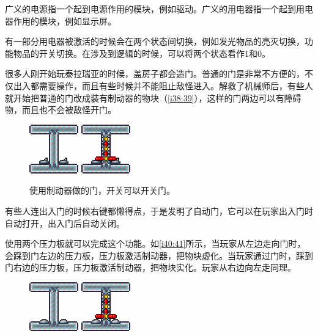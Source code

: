 广义的电源指一个起到电源作用的模块，例如驱动。广义的用电器指一个起到用电器作用的模块，例如显示屏。

有一部分用电器被激活的时候会在两个状态间切换，例如发光物品的亮灭切换，功能物品的开关切换。在涉及到逻辑的时候，可以将两个状态看作1和0。

\begin{example}[自动门]\label{exa5}

很多人刚开始玩泰拉瑞亚的时候，盖房子都会造门。普通的门是非常不方便的，不仅出入都需要操作，而且有些时候并不能阻止敌怪进入。解救了机械师后，有些人就开始把普通的门改成装有制动器的物块（\autoref{i38:39}），这样的门两边可以有障碍物，而且也不会被敌怪开门。

\begin{figure}[!ht]
\begin{center}
\includegraphics{images/38.png}
\qquad
\includegraphics{images/39.png}
\end{center}
\caption{使用制动器做的门，开关可以开关门。}
\label{i38:39}
\end{figure}

有些人连出入门的时候右键都懒得点，于是发明了自动门，它可以在玩家出入门时自动打开，出入门后自动关闭。

使用两个压力板就可以完成这个功能。如\autoref{i40:41}所示，当玩家从左边走向门时，会踩到门左边的压力板，压力板激活制动器，把物块虚化。当玩家通过门时，踩到门右边的压力板，压力板激活制动器，把物块实化。玩家从右边向左走同理。

\begin{figure}[!ht]
\begin{center}
\includegraphics{images/40.png}
\qquad
\includegraphics{images/41.png}
\end{center}
\caption{}
\label{i40:41}
\end{figure}


\end{example}
